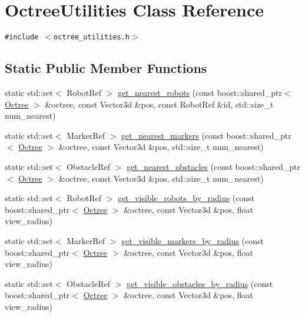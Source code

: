 \hypertarget{class_octree_utilities}{
\section{OctreeUtilities Class Reference}
\label{class_octree_utilities}
}
{\tt \#include $<$octree\_\-utilities.h$>$}

\subsection*{Static Public Member Functions}
\begin{CompactItemize}
\item 
static std::set$<$ RobotRef $>$ \hyperlink{class_octree_utilities_5a89e609e139c6b82ad9d94579811d71}{get\_\-nearest\_\-robots} (const boost::shared\_\-ptr$<$ \hyperlink{class_octree}{Octree} $>$ \&octree, const Vector3d \&pos, const RobotRef \&id, std::size\_\-t num\_\-nearest)
\item 
static std::set$<$ MarkerRef $>$ \hyperlink{class_octree_utilities_881aca84cc863219aa0b96123b70f0ca}{get\_\-nearest\_\-markers} (const boost::shared\_\-ptr$<$ \hyperlink{class_octree}{Octree} $>$ \&octree, const Vector3d \&pos, std::size\_\-t num\_\-nearest)
\item 
static std::set$<$ ObstacleRef $>$ \hyperlink{class_octree_utilities_45cebd25791115e73902559da1d3b5b7}{get\_\-nearest\_\-obstacles} (const boost::shared\_\-ptr$<$ \hyperlink{class_octree}{Octree} $>$ \&octree, const Vector3d \&pos, std::size\_\-t num\_\-nearest)
\item 
static std::set$<$ RobotRef $>$ \hyperlink{class_octree_utilities_05c722135a9cab040b67890ac5a1b8bd}{get\_\-visible\_\-robots\_\-by\_\-radius} (const boost::shared\_\-ptr$<$ \hyperlink{class_octree}{Octree} $>$ \&octree, const Vector3d \&pos, float view\_\-radius)
\item 
static std::set$<$ MarkerRef $>$ \hyperlink{class_octree_utilities_ae9db0d29166f40f0691a21f7a8e2290}{get\_\-visible\_\-markers\_\-by\_\-radius} (const boost::shared\_\-ptr$<$ \hyperlink{class_octree}{Octree} $>$ \&octree, const Vector3d \&pos, float view\_\-radius)
\item 
static std::set$<$ ObstacleRef $>$ \hyperlink{class_octree_utilities_18b26e822f6ebec9c655a65cfb12768b}{get\_\-visible\_\-obstacles\_\-by\_\-radius} (const boost::shared\_\-ptr$<$ \hyperlink{class_octree}{Octree} $>$ \&octree, const Vector3d \&pos, float view\_\-radius)
\end{CompactItemize}
